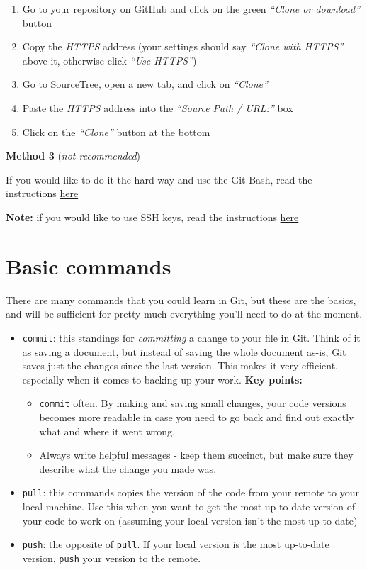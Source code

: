 \documentclass[]{book}
\providecommand{\tightlist}{%
  \setlength{\itemsep}{0pt}\setlength{\parskip}{0pt}}
\begin{document}
\begin{enumerate}
\def\labelenumi{\arabic{enumi}.}
\tightlist
\item
  Go to your repository on GitHub and click on the green \emph{``Clone or download''} button
\item
  Copy the \emph{HTTPS} address (your settings should say \emph{``Clone with HTTPS''} above it, otherwise click \emph{``Use HTTPS''})
\item
  Go to SourceTree, open a new tab, and click on \emph{``Clone''}
\item
  Paste the \emph{HTTPS} address into the \emph{``Source Path / URL:''} box
\item
  Click on the \emph{``Clone''} button at the bottom
\end{enumerate}

\textbf{Method 3} (\emph{not recommended})

If you would like to do it the hard way and use the Git Bash, read the instructions \href{https://happyGitwithr.com/push-pull-Github.html}{here}

\textbf{Note:} if you would like to use SSH keys, read the instructions \href{https://help.Github.com/articles/connecting-to-Github-with-ssh/}{here}

\hypertarget{basic-commands}{%
\section{Basic commands}\label{basic-commands}}

There are many commands that you could learn in Git, but these are the basics, and will be sufficient for pretty much everything you'll need to do at the moment.

\begin{itemize}
\tightlist
\item
  \texttt{commit}: this standings for \emph{committing} a change to your file in Git. Think of it as saving a document, but instead of saving the whole document as-is, Git saves just the changes since the last version. This makes it very efficient, especially when it comes to backing up your work.
  \textbf{Key points:}

  \begin{itemize}
  \tightlist
  \item
    \texttt{commit} often. By making and saving small changes, your code versions becomes more readable in case you need to go back and find out exactly what and where it went wrong.
  \item
    Always write helpful messages - keep them succinct, but make sure they describe what the change you made was.
  \end{itemize}
\item
  \texttt{pull}: this commands copies the version of the code from your remote to your local machine. Use this when you want to get the most up-to-date version of your code to work on (assuming your local version isn't the most up-to-date)
\item
  \texttt{push}: the opposite of \texttt{pull}. If your local version is the most up-to-date version, \texttt{push} your version to the remote.
\end{itemize}
\end{document}
